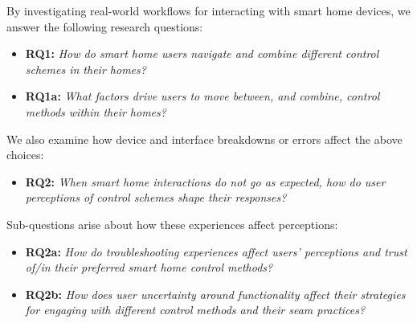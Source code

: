 By investigating real-world workflows for interacting with smart home devices, we answer the following research questions:

\begin{itemize}
    \item \textbf{RQ1: } {\it How do smart home users navigate and combine different control schemes in their homes? } 
\end{itemize}
\begin{itemize}
    \item \textbf{RQ1a: }  {\it What factors drive users to move between, and combine, control methods within their homes?}
\end{itemize}
We also examine how device and interface breakdowns
or errors affect the above choices:
\begin{itemize}
    \item \textbf{RQ2: } {\it When smart home interactions do not go as expected, how do user perceptions of control schemes shape their responses?}
\end{itemize}
Sub-questions arise about how these experiences affect perceptions: 
\begin{itemize}
        \item \textbf{RQ2a: } {\it How do troubleshooting experiences affect users' perceptions and trust of/in their preferred smart home control methods?}
        \item \textbf{RQ2b: } {\it How does user uncertainty around functionality affect their strategies for engaging with different control methods and their seam practices?}
\end{itemize}

